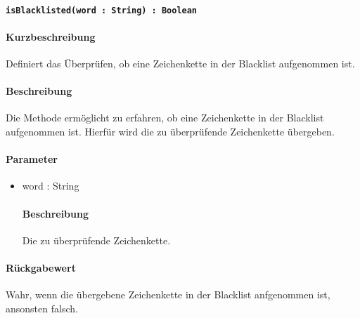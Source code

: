 \paragraph{\texttt{isBlacklisted(word : String) : Boolean}}%
\paragraph*{Kurzbeschreibung}
Definiert das Überprüfen, ob eine Zeichenkette in der Blacklist aufgenommen ist.
\paragraph*{Beschreibung}
Die Methode ermöglicht zu erfahren, ob eine Zeichenkette in der Blacklist aufgenommen ist.
Hierfür wird die zu überprüfende Zeichenkette übergeben.
\paragraph*{Parameter}
\begin{itemize}
    \item word : String
    		\paragraph*{Beschreibung}
    		Die zu überprüfende Zeichenkette.
\end{itemize}
\paragraph*{Rückgabewert}
Wahr, wenn die übergebene Zeichenkette in der Blacklist anfgenommen ist, ansonsten falsch.
